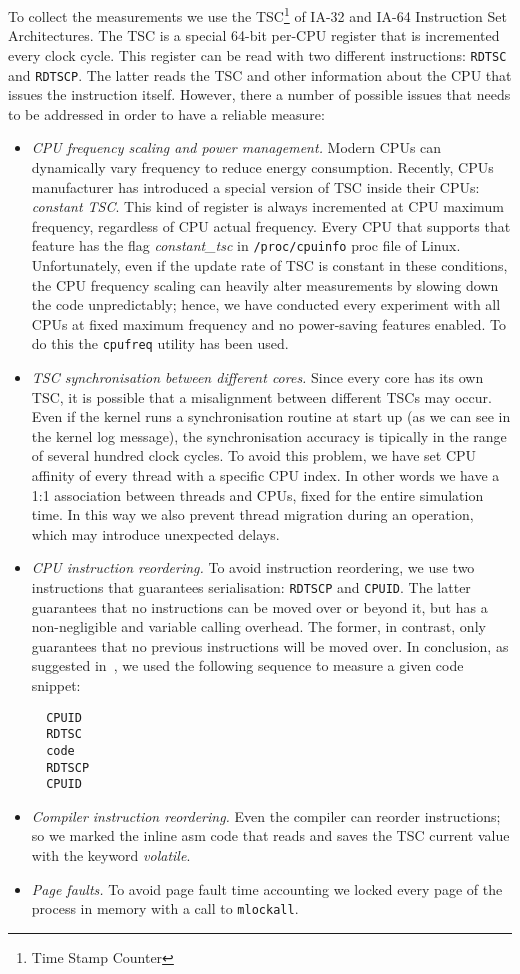 To collect the measurements we use the TSC\footnote{Time Stamp Counter} of IA-32 and IA-64 Instruction
Set Architectures. The TSC is a special 64-bit per-CPU register that is incremented every clock cycle.
This register can be read with two different instructions: \texttt{RDTSC} and \texttt{RDTSCP}. The latter
reads the TSC and other information about the CPU that issues the instruction itself. However, there a
number of possible issues that needs to be addressed in order to have a reliable measure:

\begin{itemize}
\item \emph{CPU frequency scaling and power management.} Modern CPUs can dynamically vary frequency to reduce
energy consumption. Recently, CPUs manufacturer has introduced a special version of TSC inside their CPUs:
\emph{constant TSC}. This kind of register is always incremented at CPU maximum frequency, regardless
of CPU actual frequency. Every CPU that supports that feature has the flag \emph{constant\_tsc} in
\texttt{/proc/cpuinfo} proc file of Linux. Unfortunately, even if the update rate of TSC is constant in
these conditions, the CPU frequency scaling can heavily alter measurements by slowing down the code
unpredictably; hence, we have conducted every experiment with all CPUs at fixed maximum frequency and
no power-saving features enabled. To do this the \texttt{cpufreq} utility has been used.
\item \emph{TSC synchronisation between different cores.} Since every core has its own TSC, it is
possible that a misalignment between different TSCs may occur. Even if the kernel runs a synchronisation
routine at start up (as we can see in the kernel log message), the synchronisation accuracy is tipically
in the range of several hundred clock cycles. To avoid this problem, we have set CPU affinity of every
thread with a specific CPU index. In other words we have a 1:1 association between threads and CPUs, fixed
for the entire simulation time. In this way we also prevent thread migration during an operation, which
may introduce unexpected delays.
\item \emph{CPU instruction reordering.} To avoid instruction reordering, we use two instructions that
guarantees serialisation: \texttt{RDTSCP} and \texttt{CPUID}. The latter guarantees that no instructions
can be moved over or beyond it, but has a non-negligible and variable calling overhead. The former, in
contrast, only guarantees that no previous instructions will be moved over. In conclusion, as suggested
in~\cite{intelTSCpaper}, we used the following sequence to measure a given code snippet:
\begin{lstlisting}
  CPUID
  RDTSC
  code
  RDTSCP 
  CPUID
\end{lstlisting}
\item \emph{Compiler instruction reordering.} Even the compiler can reorder instructions; so we marked the
inline asm code that reads and saves the TSC current value with the keyword \emph{volatile}.
\item \emph{Page faults.} To avoid page fault time accounting we locked every page of the process in memory
with a call to \texttt{mlockall}.
\end{itemize}

